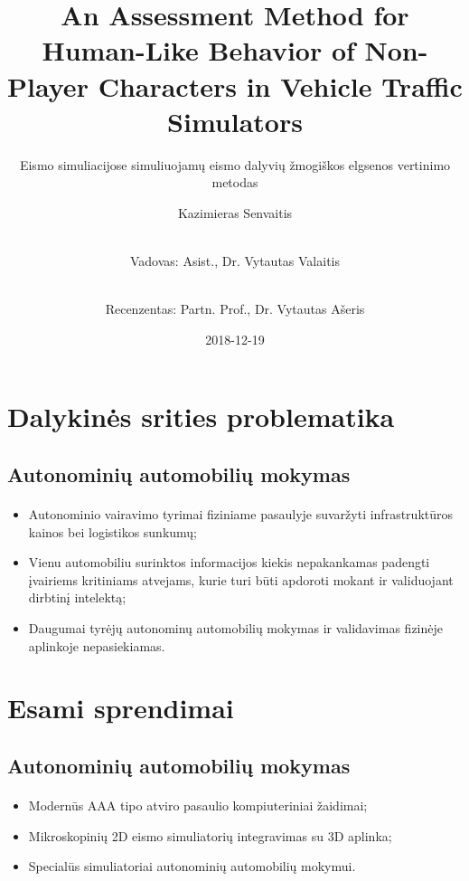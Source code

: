 \documentclass{beamer}
\title{An Assessment Method for Human-Like Behavior of Non-Player Characters in Vehicle Traffic Simulators}
\subtitle{Eismo simuliacijose simuliuojamų eismo dalyvių žmogiškos elgsenos vertinimo metodas}
\author[shortname]{Kazimieras Senvaitis \and \\ Vadovas: Asist., Dr. Vytautas Valaitis  \and \\ Recenzentas: Partn. Prof., Dr. Vytautas Ašeris}
\date{2018-12-19}
\begin{document}
	
\maketitle


\section{Dalykinės srities problematika}

\subsection{Autonominių automobilių mokymas}
\begin{frame}{\insertsection}
\framesubtitle{\insertsubsection}
\begin{itemize}
	\item Autonominio vairavimo tyrimai fiziniame pasaulyje suvaržyti infrastruktūros kainos bei logistikos sunkumų;
	\item Vienu automobiliu surinktos informacijos kiekis nepakankamas padengti įvairiems kritiniams atvejams, kurie turi būti apdoroti mokant ir validuojant dirbtinį intelektą;
	\item Daugumai tyrėjų autonominų automobilių mokymas ir validavimas fizinėje aplinkoje nepasiekiamas.
\end{itemize}
\end{frame}



\section{Esami sprendimai}

\subsection{Autonominių automobilių mokymas}
\begin{frame}{\insertsection}
\framesubtitle{\insertsubsection}
\begin{itemize}
	\item Modernūs AAA tipo atviro pasaulio kompiuteriniai žaidimai;
	\item Mikroskopinių 2D eismo simuliatorių integravimas su 3D aplinka;
	\item Specialūs simuliatoriai autonominių automobilių mokymui.
\end{itemize}
\end{frame}
\end{document}
